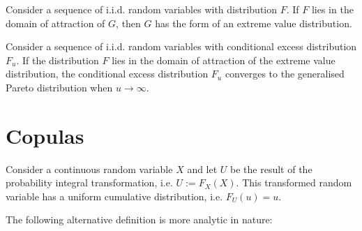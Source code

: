 
    \begin{theorem}
        Consider a sequence of i.i.d. random variables with distribution $F$. If $F$ lies in the domain of attraction of $G$, then $G$ has the form of an extreme value distribution.
    \end{theorem}

    \begin{theorem}
        Consider a sequence of i.i.d. random variables with conditional excess distribution $F_u$. If the distribution $F$ lies in the domain of attraction of the extreme value distribution, the conditional excess distribution $F_u$ converges to the generalised Pareto distribution when $u\longrightarrow\infty$.
    \end{theorem}

\section{Copulas}

    \begin{property}
        Consider a continuous random variable $X$ and let $U$ be the result of the probability integral transformation, i.e. $U:=F_X(X)$. This transformed random variable has a uniform cumulative distribution, i.e. $F_U(u)=u$.
    \end{property}

    The following alternative definition is more analytic in nature:

